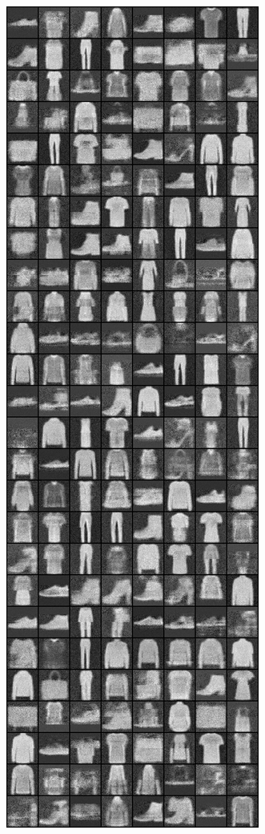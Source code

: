\begin{figure}
\includegraphics[width=\picwidth\columnwidth]{figures/supplementary/alternative_fmnist/image_5000.png}

\end{figure}

